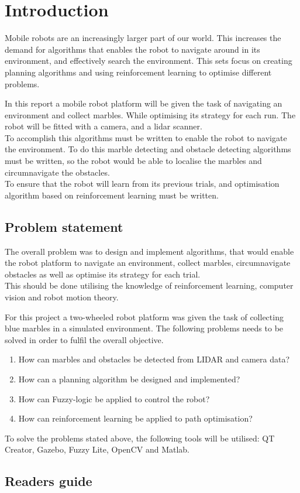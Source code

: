 \documentclass[../Head/Main.tex]{subfiles}
\begin{document}
\section{Introduction}
Mobile robots are an increasingly larger part of our world. This increases the demand for algorithms that enables the robot to navigate around in its environment, and effectively search the environment. This sets focus on creating planning algorithms and using reinforcement learning to optimise different problems.\par 
In this report a mobile robot platform will be given the task of navigating an environment and collect marbles. While optimising its strategy for each run. The robot will be fitted with a camera, and a lidar scanner.\\
To accomplish this algorithms must be written to enable the robot to navigate the environment. To do this marble detecting and obstacle detecting algorithms must be written, so the robot would be able to localise the marbles and circumnavigate the obstacles.\\
To ensure that the robot will learn from its previous trials, and optimisation algorithm based on reinforcement learning must be written.    

\subsection{Problem statement}
The overall problem was to design and implement algorithms, that would enable the robot platform to navigate an environment, collect marbles, circumnavigate obstacles as well as optimise its strategy for each trial.\\
This should be done utilising the knowledge of reinforcement learning, computer vision and robot motion theory.\par
For this project a two-wheeled robot platform was given the task of collecting blue marbles in a simulated environment. The following problems needs to be solved in order to fulfil the overall objective.

\begin{enumerate}
        \item How can marbles and obstacles be detected from LIDAR and camera data?
		\item How can a planning algorithm be designed and implemented?
		\item How can Fuzzy-logic be applied to control the robot?
		\item How can reinforcement learning be applied to path optimisation?
\end{enumerate}
To solve the problems stated above, the following tools will be utilised: QT Creator, Gazebo, Fuzzy Lite, OpenCV and Matlab.

\subsection{Readers guide}
\end{document}
